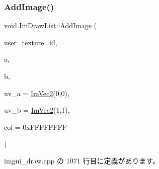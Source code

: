 \subsubsection{\texorpdfstring{Add\+Image()}{AddImage()}}
{\footnotesize\ttfamily void Im\+Draw\+List\+::\+Add\+Image (\begin{DoxyParamCaption}\item[{\mbox{\hyperlink{imgui_8h_a364f4447ecbc4ca176145ccff9db6286}{Im\+Texture\+ID}}}]{user\+\_\+texture\+\_\+id,  }\item[{const \mbox{\hyperlink{struct_im_vec2}{Im\+Vec2}} \&}]{a,  }\item[{const \mbox{\hyperlink{struct_im_vec2}{Im\+Vec2}} \&}]{b,  }\item[{const \mbox{\hyperlink{struct_im_vec2}{Im\+Vec2}} \&}]{uv\+\_\+a = {\ttfamily \mbox{\hyperlink{struct_im_vec2}{Im\+Vec2}}(0,0)},  }\item[{const \mbox{\hyperlink{struct_im_vec2}{Im\+Vec2}} \&}]{uv\+\_\+b = {\ttfamily \mbox{\hyperlink{struct_im_vec2}{Im\+Vec2}}(1,1)},  }\item[{\mbox{\hyperlink{imgui_8h_a118cff4eeb8d00e7d07ce3d6460eed36}{Im\+U32}}}]{col = {\ttfamily 0xFFFFFFFF} }\end{DoxyParamCaption})}



 imgui\+\_\+draw.\+cpp の 1071 行目に定義があります。

\mbox{\label{struct_im_draw_list_a1cc1f8d4d1812c65c7887b8d5aef31fe}} 
